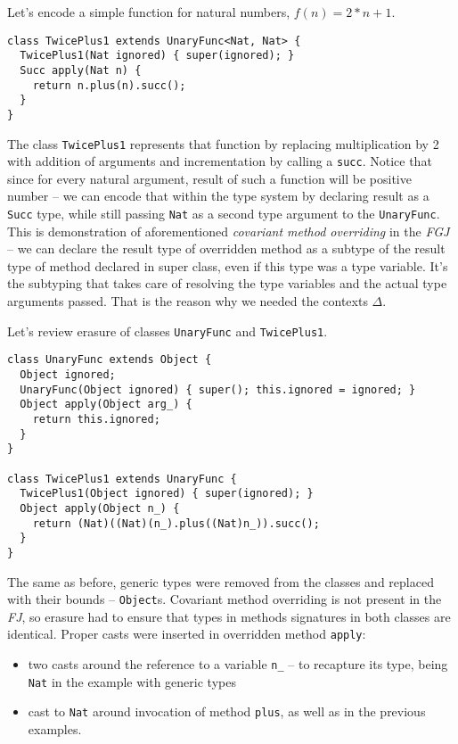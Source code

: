\documentclass{article}[12pt]
\begin{document}
Let's encode a simple function for natural numbers, $f(n) = 2 * n + 1$.

\begin{verbatim}
class TwicePlus1 extends UnaryFunc<Nat, Nat> {
  TwicePlus1(Nat ignored) { super(ignored); }
  Succ apply(Nat n) {
    return n.plus(n).succ();
  }
}
\end{verbatim}
The class \texttt{TwicePlus1} represents that function by replacing
multiplication by 2 with addition of arguments and incrementation
by calling a \texttt{succ}. Notice that since for every natural argument,
result of such a function will be positive number -- we can encode that
within the type system by declaring result as a \texttt{Succ} type,
while still passing \texttt{Nat} as a second type argument to
the \texttt{UnaryFunc}. This is demonstration of aforementioned
\emph{covariant method overriding} in the \emph{FGJ} -- we can declare
the result type of overridden method as a subtype of the result type
of method declared in super class, even if this type was a
type variable. It's the subtyping that takes care of resolving
the type variables and the actual type arguments passed.
That is the reason why we needed the contexts $\Delta$.

Let's review erasure of classes \texttt{UnaryFunc} and
\texttt{TwicePlus1}.

\begin{verbatim}
class UnaryFunc extends Object {
  Object ignored;
  UnaryFunc(Object ignored) { super(); this.ignored = ignored; }
  Object apply(Object arg_) {
    return this.ignored;
  }
}

class TwicePlus1 extends UnaryFunc {
  TwicePlus1(Object ignored) { super(ignored); }
  Object apply(Object n_) {
    return (Nat)((Nat)(n_).plus((Nat)n_)).succ();
  }
}
\end{verbatim}
The same as before, generic types were removed from the classes
and replaced with their bounds -- \texttt{Object}s. Covariant
method overriding is not present in the \emph{FJ}, so erasure had
to ensure that types in methods signatures in both classes are
identical. Proper casts were inserted in overridden method
\texttt{apply}:

\begin{itemize}
\item two casts around the reference to a variable \texttt{n\_} --
  to recapture its type, being \texttt{Nat} in the example with
  generic types
\item cast to \texttt{Nat} around invocation of method
  \texttt{plus}, as well as in the previous examples.
\end{itemize}
\end{document}

